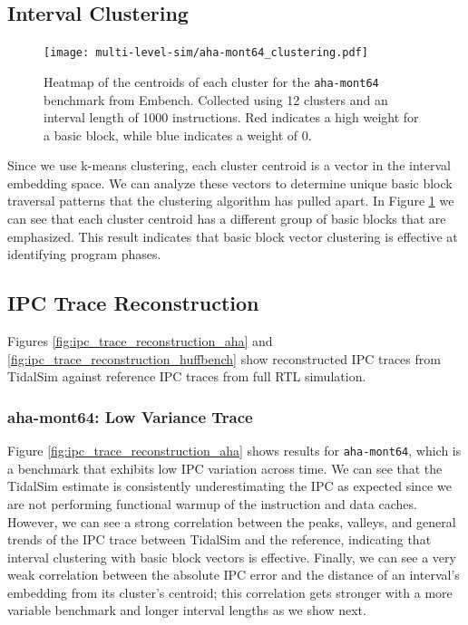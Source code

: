 \documentclass[sigplan,nonacm,10pt]{acmart}
\begin{document}
\subsection{Interval Clustering}

\begin{figure}
  \texttt{[image: multi-level-sim/aha-mont64\_clustering.pdf]}
  \caption{Heatmap of the centroids of each cluster for the \texttt{aha-mont64} benchmark from Embench. Collected using 12 clusters and an interval length of 1000 instructions. Red indicates a high weight for a basic block, while blue indicates a weight of 0.}
  \label{fig:interval_clustering}
\end{figure}

Since we use k-means clustering, each cluster centroid is a vector in the interval embedding space.
We can analyze these vectors to determine unique basic block traversal patterns that the clustering algorithm has pulled apart.
In Figure \ref{fig:interval_clustering} we can see that each cluster centroid has a different group of basic blocks that are emphasized.
This result indicates that basic block vector clustering is effective at identifying program phases.

\subsection{IPC Trace Reconstruction}

Figures \ref{fig:ipc_trace_reconstruction_aha} and \ref{fig:ipc_trace_reconstruction_huffbench} show reconstructed IPC traces from TidalSim against reference IPC traces from full RTL simulation.

\subsubsection{aha-mont64: Low Variance Trace}

Figure \ref{fig:ipc_trace_reconstruction_aha} shows results for \texttt{aha-mont64}, which is a benchmark that exhibits low IPC variation across time.
We can see that the TidalSim estimate is consistently underestimating the IPC as expected since we are not performing functional warmup of the instruction and data caches.
However, we can see a strong correlation between the peaks, valleys, and general trends of the IPC trace between TidalSim and the reference, indicating that interval clustering with basic block vectors is effective.
Finally, we can see a very weak correlation between the absolute IPC error and the distance of an interval's embedding from its cluster's centroid; this correlation gets stronger with a more variable benchmark and longer interval lengths as we show next.
\end{document}
